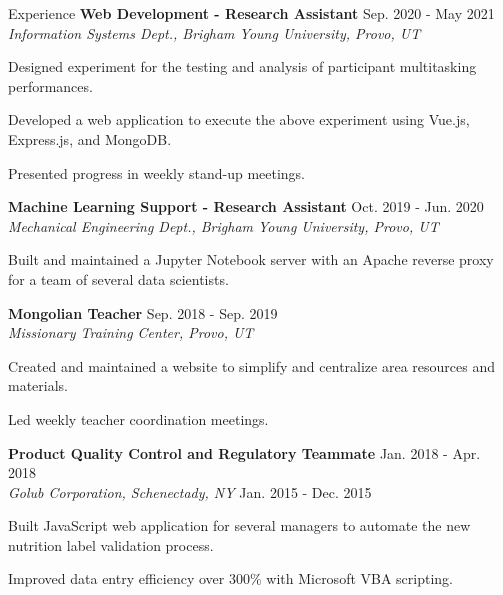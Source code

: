 \documentclass{resume} %
\begin{document}
\begin{rSection}{Experience}
    \textbf{Web Development - Research Assistant}\hfill{ Sep.  2020 - May 2021}\\
    \textit{Information Systems Dept., Brigham Young University, Provo, UT} 
    \begin{compactitem}
        \item Designed experiment for the testing and analysis of participant multitasking
            performances.
        \item Developed a web application to execute the above experiment using Vue.js, Express.js, and
            MongoDB.
        \item Presented progress in weekly stand-up meetings.
    \end{compactitem}
\textbf{Machine Learning Support - Research Assistant} \hfill{Oct. 2019
- Jun. 2020}\\
\textit{Mechanical Engineering Dept., Brigham Young University, Provo, UT}
    \begin{compactitem}
        \item Built and maintained a Jupyter Notebook server with an Apache reverse proxy for a team of
            several data scientists.
    \end{compactitem}
\textbf{Mongolian Teacher} \hfill {Sep. 2018 - Sep. 2019}\\
\textit{Missionary Training Center, Provo, UT} 
    \begin{compactitem}
        \item Created and maintained a website to simplify and centralize area resources and
            materials.
        \item Led weekly teacher coordination meetings.
    \end{compactitem}
\textbf{Product Quality Control and Regulatory Teammate}    \hfill {Jan. 2018 -
Apr. 2018}\\
\textit{Golub Corporation, Schenectady, NY}                 \hfill {Jan. 2015 -
Dec. 2015}  
    \begin{compactitem}
        \item Built JavaScript web application for several managers to automate the new nutrition label
            validation process.
        \item Improved data entry efficiency over 300\% with Microsoft VBA scripting.
    \end{compactitem}
\end{rSection}
\end{document}
